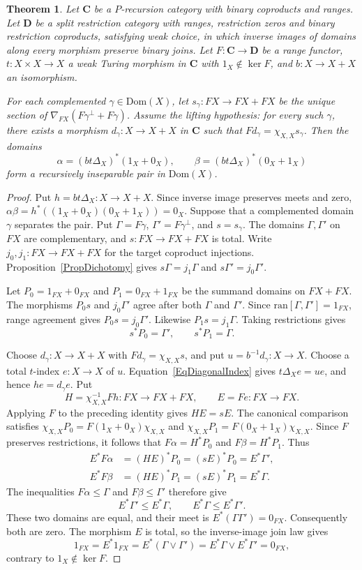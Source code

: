 \documentclass[letterpaper,10pt]{amsart}
\theoremstyle{plain}
\newtheorem{thm}{Theorem}[section]
\theoremstyle{definition}
\begin{document}
\begin{thm}\label{ThmRecIns}
Let $\mathbf C$ be a $P$-recursion category with binary coproducts and
ranges. Let $\mathbf D$ be a split restriction category with ranges,
restriction zeros and binary restriction coproducts, satisfying weak
choice, in which inverse images of domains along every morphism preserve
binary joins. Let $F:\mathbf C\to\mathbf D$ be a range functor,
$t:X\times X\to X$ a weak Turing morphism in $\mathbf C$ with
$1_X\notin\ker F$, and $b:X\to X+X$ an isomorphism.

For each complemented $\gamma\in\mathrm{Dom}(X)$, let
$s_\gamma:FX\to FX+FX$ be the unique section of
$\nabla_{FX}(F\gamma^\perp+F\gamma)$. Assume the \textit{lifting
hypothesis}: for every such $\gamma$, there exists a morphism
$d_\gamma:X\to X+X$ in $\mathbf C$ such that
$Fd_\gamma=\chi_{X,X}s_\gamma$. Then the domains
\[
\alpha=(bt\Delta_X)^*(1_X+0_X),\qquad
\beta=(bt\Delta_X)^*(0_X+1_X)
\]
form a recursively inseparable pair in $\mathrm{Dom}(X)$.
\end{thm}
\begin{proof}
Put $h=bt\Delta_X:X\to X+X$. Since inverse image preserves meets
and zero, $\alpha\beta=h^*((1_X+0_X)(0_X+1_X))=0_X$.
Suppose that a complemented domain $\gamma$ separates the pair. Put
$\Gamma=F\gamma$, $\Gamma'=F\gamma^\perp$, and $s=s_\gamma$.
The domains $\Gamma,\Gamma'$ on $FX$ are complementary, and
$s:FX\to FX+FX$ is total. Write $j_0,j_1:FX\to FX+FX$ for the target
coproduct injections. Proposition~\ref{PropDichotomy} gives
$s\Gamma=j_1\Gamma$ and $s\Gamma'=j_0\Gamma'$.

Let $P_0=1_{FX}+0_{FX}$ and $P_1=0_{FX}+1_{FX}$ be the summand
domains on $FX+FX$. The morphisms $P_0s$ and $j_0\Gamma'$ agree
after both $\Gamma$ and $\Gamma'$. Since
$\mathrm{ran}[\Gamma,\Gamma']=1_{FX}$, range agreement gives
$P_0s=j_0\Gamma'$. Likewise $P_1s=j_1\Gamma$. Taking restrictions
gives
\[
 s^*P_0=\Gamma',\qquad s^*P_1=\Gamma.
\]

Choose $d_\gamma:X\to X+X$ with
$Fd_\gamma=\chi_{X,X}s$, and put
$u=b^{-1}d_\gamma:X\to X$.
Choose a total $t$-index $e:X\to X$ of $u$.
Equation~\eqref{EqDiagonalIndex} gives
$t\Delta_Xe=ue$, and hence $he=d_\gamma e$.
Put
\[
 H=\chi_{X,X}^{-1}Fh:FX\to FX+FX,
 \qquad E=Fe:FX\to FX.
\]
Applying $F$ to the preceding identity gives $HE=sE$.
The canonical comparison satisfies
$\chi_{X,X}P_0=F(1_X+0_X)\chi_{X,X}$ and
$\chi_{X,X}P_1=F(0_X+1_X)\chi_{X,X}$.
Since $F$ preserves restrictions, it follows that
$F\alpha=H^*P_0$ and $F\beta=H^*P_1$. Thus
\[
 \begin{aligned}
 E^*F\alpha&=(HE)^*P_0=(sE)^*P_0=E^*\Gamma',\\
 E^*F\beta&=(HE)^*P_1=(sE)^*P_1=E^*\Gamma.
 \end{aligned}
\]
The inequalities $F\alpha\le\Gamma$ and $F\beta\le\Gamma'$
therefore give
\[
 E^*\Gamma'\le E^*\Gamma,\qquad E^*\Gamma\le E^*\Gamma'.
\]
These two domains are equal, and their meet is
$E^*(\Gamma\Gamma')=0_{FX}$. Consequently both are zero.
The morphism $E$ is total, so the inverse-image join law gives
\[
 1_{FX}=E^*1_{FX}
       =E^*(\Gamma\vee\Gamma')
       =E^*\Gamma\vee E^*\Gamma'=0_{FX},
\]
contrary to $1_X\notin\ker F$.
\end{proof}
\end{document}
